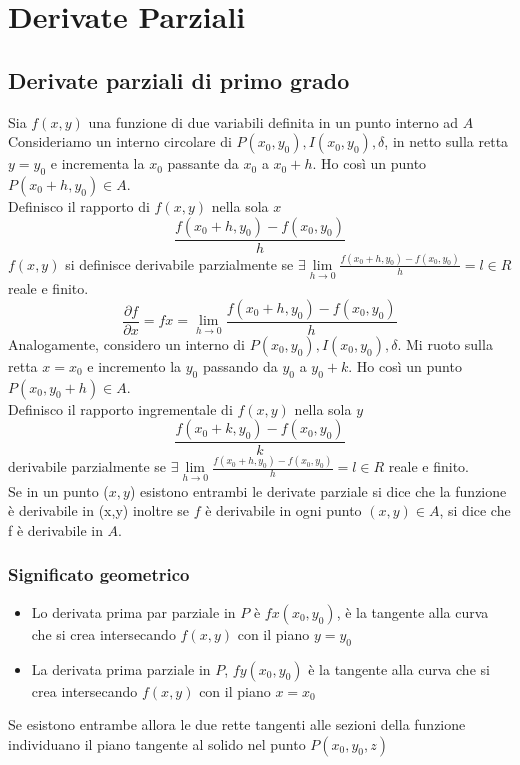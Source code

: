 \chapter{Derivate Parziali}
\section{Derivate parziali di primo grado}
\begin{defi}
  Sia $f(x,y)$ una funzione di due variabili definita in un punto interno ad $A$\\
  Consideriamo un interno circolare di $P(x_0,y_0),I(x_0,y_0), \delta$, in netto sulla retta $y=y_0$ e
  incrementa la $x_0$ passante da $x_0$ a $x_0+h$. Ho così un punto $P(x_0+h,y_0)\in A$.\\
  Definisco il rapporto di $f(x,y)$ nella sola $x$
  \begin{equation}
    \frac{f(x_0+h,y_0)-f(x_0,y_0)}{h}
  \end{equation}
  $f(x,y)$ si definisce {\color{red} derivabile parzialmente} se $\exists \lim\limits_{h\to 0}\frac{f(x_0+h,y_0)-f(x_0,y_0)}{h} = l\in R$ reale e finito.
  \begin{equation}
    \frac{\partial f}{\partial x} =fx=\lim\limits_{h\to 0}\frac{f(x_0+h,y_0)-f(x_0,y_0)}{h}
  \end{equation}
  Analogamente, considero un interno di $P(x_0,y_0), I(x_0,y_0),\delta$. Mi ruoto sulla retta $x=x_0$ e
  incremento la $y_0$ passando da $y_0$ a $y_0+k$. Ho così un punto $P(x_0,y_0+h)\in A$.\\
  Definisco il rapporto ingrementale di $f(x,y)$ nella sola $y$
  \begin{equation*}
    \frac{f(x_0+k,y_0)-f(x_0,y_0)}{k}
  \end{equation*}
  {\color{red} derivabile parzialmente} se $\exists \lim\limits_{h\to 0}\frac{f(x_0+h,y_0)-f(x_0,y_0)}{h} =
  l\in R$ reale e finito.\\
  Se in un punto ($x,y$) esistono entrambi le derivate parziale si dice che la funzione è {\color{red} derivabile}
  in (x,y) inoltre se $f$ è derivabile in ogni punto $(x,y)\in A$, si dice che f è derivabile in $A$.
\end{defi}
\subsection{Significato geometrico}
\begin{itemize}
\item Lo derivata prima par parziale in $P$ è $fx(x_0,y_0)$, è la tangente alla curva che si crea intersecando
  $f(x,y)$ con il piano $y=y_0$
\item La derivata prima parziale in $P$, $fy(x_0,y_0)$ è la tangente alla curva che si
  crea intersecando $f(x,y)$ con il piano $x=x_0$
\end{itemize}
Se esistono entrambe allora le due rette tangenti alle sezioni della funzione individuano il piano tangente al
solido nel punto $P(x_0,y_0,z)$

